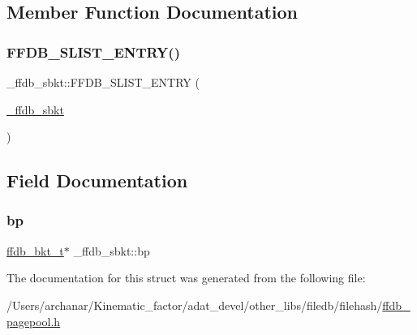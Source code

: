 \subsection{Member Function Documentation}
\mbox{\label{struct__ffdb__sbkt_a63f40d019cc51c813c024f7939999003}} 
\subsubsection{\texorpdfstring{FFDB\_SLIST\_ENTRY()}{FFDB\_SLIST\_ENTRY()}}
{\footnotesize\ttfamily \+\_\+ffdb\+\_\+sbkt\+::\+F\+F\+D\+B\+\_\+\+S\+L\+I\+S\+T\+\_\+\+E\+N\+T\+RY (\begin{DoxyParamCaption}\item[{\mbox{\hyperlink{struct__ffdb__sbkt}{\+\_\+ffdb\+\_\+sbkt}}}]{ }\end{DoxyParamCaption})}



\subsection{Field Documentation}
\mbox{\label{struct__ffdb__sbkt_a777816cc2d046ff74eea9c6262c561c4}} 
\subsubsection{\texorpdfstring{bp}{bp}}
{\footnotesize\ttfamily \mbox{\hyperlink{ffdb__pagepool_8h_a7d7436d10d66de8bbe2325c37cd7a5ef}{ffdb\+\_\+bkt\+\_\+t}}$\ast$ \+\_\+ffdb\+\_\+sbkt\+::bp}



The documentation for this struct was generated from the following file\+:\begin{DoxyCompactItemize}
\item 
/\+Users/archanar/\+Kinematic\+\_\+factor/adat\+\_\+devel/other\+\_\+libs/filedb/filehash/\mbox{\hyperlink{ffdb__pagepool_8h}{ffdb\+\_\+pagepool.\+h}}\end{DoxyCompactItemize}
